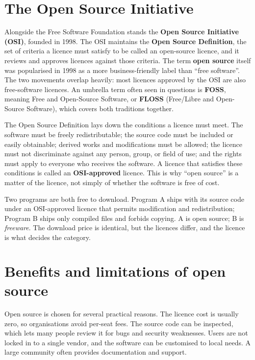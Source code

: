 \section{The Open Source Initiative}
Alongside the Free Software Foundation stands the \textbf{Open Source
Initiative (OSI)}, founded in 1998. The OSI maintains the \textbf{Open Source
Definition}, the set of criteria a licence must satisfy to be called an
open-source licence, and it reviews and approves licences against those
criteria. The term \textbf{open source} itself was popularised in 1998 as a
more business-friendly label than ``free software''. The two movements
overlap heavily: most licences approved by the OSI are also free-software
licences. An umbrella term often seen in questions is \textbf{FOSS}, meaning
Free and Open-Source Software, or \textbf{FLOSS} (Free/Libre and Open-Source
Software), which covers both traditions together.

The Open Source Definition lays down the conditions a licence must meet. The
software must be freely redistributable; the source code must be included or
easily obtainable; derived works and modifications must be allowed; the
licence must not discriminate against any person, group, or field of use; and
the rights must apply to everyone who receives the software. A licence that
satisfies these conditions is called an \textbf{OSI-approved} licence. This is
why ``open source'' is a matter of the licence, not simply of whether the
software is free of cost.

\begin{example}
Two programs are both free to download. Program A ships with its source code
under an OSI-approved licence that permits modification and redistribution;
Program B ships only compiled files and forbids copying. A is open source; B
is \emph{freeware}. The download price is identical, but the licences differ,
and the licence is what decides the category.
\end{example}

\section{Benefits and limitations of open source}
Open source is chosen for several practical reasons. The licence cost is
usually zero, so organisations avoid per-seat fees. The source code can be
inspected, which lets many people review it for bugs and security weaknesses.
Users are not locked in to a single vendor, and the software can be
customised to local needs. A large community often provides documentation and
support.


